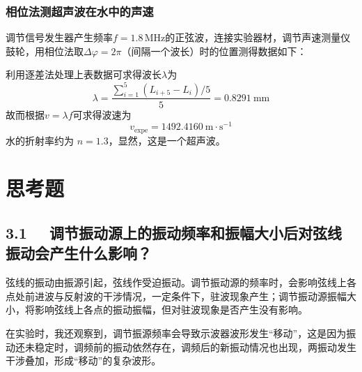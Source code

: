 \documentclass[UTF8]{article}
\theoremstyle{MyLineTheoremStyle} %
\theoremstyle{MyBlockTheoremStyle} %
\theoremstyle{MySubsubsectionStyle} %
\begin{document}
\subsubsection{相位法测超声波在水中的声速}
调节信号发生器产生频率$ f=1.8\,\mathrm{MHz} $的正弦波，连接实验器材，调节声速测量仪鼓轮，用相位法取$ \Delta\varphi=2\pi $（间隔一个波长）时的位置测得数据如下：
\begin{table}[H]\centering
    \caption{驻波法求水中超声波波速}
    \label{驻波法求水中超声波波速}
\end{table}

利用逐差法处理上表数据可求得波长$ \lambda $为
\begin{equation}
\lambda=\frac{\sum_{i=1}^{5}(L_{i+5}-L_i)/5}{5}= 0.8291 \ \mathrm{mm}
\end{equation}
故而根据$ v=\lambda f $可求得波速为
\begin{equation}
    v_{\text{expe}} = 1492.4160\ \mathrm{m \cdot s^{-1}}
\end{equation}
水的折射率约为 $n = 1.3$，显然，这是一个超声波。


\section{思考题}

\subsection*{3.1 \ \ 调节振动源上的振动频率和振幅大小后对弦线振动会产生什么影响？}

弦线的振动由振源引起，弦线作受迫振动。调节振动源的频率时，会影响弦线上各点处前进波与反射波的干涉情况，一定条件下，驻波现象产生；调节振动源振幅大小，将影响弦线上各点的振动振幅，但对驻波现象是否产生没有影响。

在实验时，我还观察到，调节振源频率会导致示波器波形发生“移动”，这是因为振动还未稳定时，调频前的振动依然存在，调频后的新振动情况也出现，两振动发生干涉叠加，形成“移动”的复杂波形。
\end{document}
